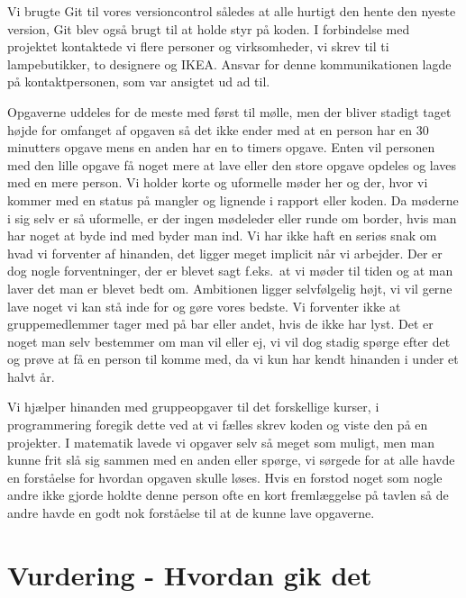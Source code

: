 \documentclass[oneside,a4paper,titlepage]{article}
\begin{document}
Vi brugte Git til vores versioncontrol således at alle hurtigt den hente den nyeste version, Git blev også brugt til at holde styr på koden. I forbindelse med projektet kontaktede vi flere personer og virksomheder, vi skrev til ti lampebutikker, to designere og IKEA. Ansvar for denne kommunikationen lagde på kontaktpersonen, som var ansigtet ud ad til. 

Opgaverne uddeles for de meste med først til mølle, men der bliver stadigt taget højde for omfanget af opgaven så det ikke ender med at en person har en 30 minutters opgave mens en anden har en to timers opgave. Enten vil personen med den lille opgave få noget mere at lave eller den store opgave opdeles og laves med en mere person. Vi holder korte og uformelle møder her og der, hvor vi kommer med en status på mangler og lignende i rapport eller koden. Da møderne i sig selv er så uformelle, er der ingen mødeleder eller runde om border, hvis man har noget at byde ind med byder man ind. 
Vi har ikke haft en seriøs snak om hvad vi forventer af hinanden, det ligger meget implicit når vi arbejder. Der er dog nogle forventninger, der er blevet sagt f.eks.\ at vi møder til tiden og at man laver det man er blevet bedt om. Ambitionen ligger selvfølgelig højt, vi vil gerne lave noget vi kan stå inde for og gøre vores bedste. Vi forventer ikke at gruppemedlemmer tager med på bar eller andet, hvis de ikke har lyst. Det er noget man selv bestemmer om man vil eller ej, vi vil dog stadig spørge efter det og prøve at få en person til komme med, da vi kun har kendt hinanden i under et halvt år. 

Vi hjælper hinanden med gruppeopgaver til det forskellige kurser, i programmering foregik dette ved at vi fælles skrev koden og viste den på en projekter. I matematik lavede vi opgaver selv så meget som muligt, men man kunne frit slå sig sammen med en anden eller spørge, vi sørgede for at alle havde en forståelse for hvordan opgaven skulle løses. Hvis en forstod noget som nogle andre ikke gjorde holdte denne person ofte en kort fremlæggelse på tavlen så de andre havde en godt nok forståelse til at de kunne lave opgaverne. 







\section{Vurdering - Hvordan gik det}
\end{document}
